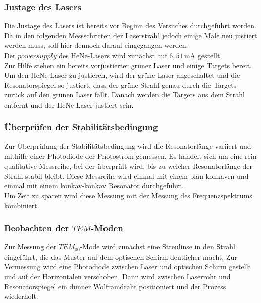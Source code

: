 \subsubsection{Justage des Lasers}

Die Justage des Lasers ist bereits vor Beginn des Versuches durchgeführt worden.
Da in den folgenden Messschritten der Laserstrahl jedoch einige Male neu justiert werden muss, soll hier dennoch darauf eingegangen werden. \\

Der $power supply$ des HeNe-Lasers wird zunächst auf $6,51 \,\unit{\milli\ampere}$ gestellt. \\ %
Zur Hilfe stehen ein bereits vorjustierter grüner Laser und einige Targets bereit.
Um den HeNe-Laser zu justieren, wird der grüne Laser angeschaltet und die Resonatorspiegel so justiert, dass der grüne Strahl genau durch die Targets zurück auf den grünen Laser fällt.
Danach werden die Targets aus dem Strahl entfernt und der HeNe-Laser justiert sein.

\subsubsection{Überprüfen der Stabilitätsbedingung}

Zur Überprüfung der Stabilitätsbedingung wird die Resonatorlänge variiert und mithilfe einer Photodiode der Photostrom gemessen. Es handelt sich um eine rein qualitative Messreihe, bei der überprüft wird,
bis zu welcher Resonatorlänge der Strahl stabil bleibt. 
Diese Messreihe wird einmal mit einem plan-konkaven und einmal mit einem konkav-konkav Resonator durchgeführt. \\

Um Zeit zu sparen wird diese Messung mit der Messung des Frequenzspektrums kombiniert.


\subsubsection{Beobachten der $TEM$-Moden}

Zur Messung der $TEM_{00}$-Mode wird zunächst eine Streulinse in den Strahl eingeführt, die das Muster auf dem optischen Schirm deutlicher macht.
Zur Vermessung wird eine Photodiode zwischen Laser und optischen Schirm gestellt und auf der Horizontalen verschoben.
Dann wird zwischen Laserrohr und Resonatorspiegel ein dünner Wolframdraht positioniert und der Prozess wiederholt.


